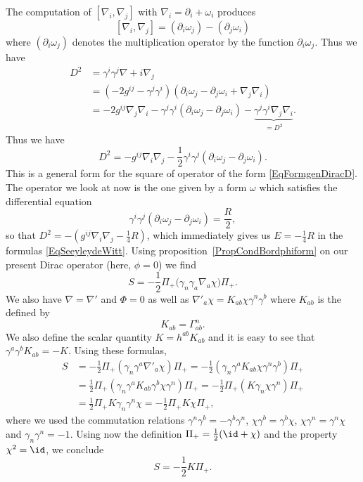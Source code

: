 The computation of $[\nabla_i,\nabla_j]$ with $\nabla_i=\partial_i+\omega_i$ produces
\[
	[\nabla_i,\nabla_j]=(\partial_i\omega_j)-(\partial_j\omega_i)
\]
where $(\partial_i\omega_j)$ denotes the multiplication operator by the function $\partial_i\omega_j$. Thus we have
\begin{equation}
	\begin{split}
		D^2	&=\gamma^i\gamma^j\nabla+i\nabla_j\\
		&=(-2g^{ij}-\gamma^j\gamma^i)(\partial_i\omega_j-\partial_j\omega_i+\nabla_j\nabla_i)\\
		&=-2g^{ij}\nabla_j\nabla_i-\gamma^j\gamma^i(\partial_i\omega_j-\partial_j\omega_i)-\underbrace{\gamma^j\gamma^i\nabla_j\nabla_i}_{=D^2}.
	\end{split}
\end{equation}
Thus we have
\begin{equation}
	D^2=-g^{ij}\nabla_i\nabla_j-\frac{ 1 }{2}\gamma^i\gamma^j(\partial_i\omega_j-\partial_j\omega_i).
\end{equation}
This is a general form for the square of operator of the form \eqref{EqFormgenDiracD}. The operator we look at now is the one given by a form $\omega$ which satisfies the differential equation
\begin{equation}
	\gamma^i\gamma^j(\partial_i\omega_j-\partial_j\omega_i)=\frac{ R }{ 2 },
\end{equation}
so that $D^2=-(g^{ij}\nabla_i\nabla_j-\frac{1}{ 4 }R)$, which immediately gives us $E=-\frac{1}{ 4 }R$ in the formulas \eqref{EqSeeyleydeWitt}. Using proposition~\ref{PropCondBordphiform} on our present Dirac operator (here, $\phi=0$) we find
\begin{equation}
	S=-\frac{1}{ 2 }\Pi_+\big(\gamma_n\gamma_a\nabla_a\chi \big)\Pi_+.
\end{equation}
We also have $\nabla=\nabla'$ and $\Phi=0$ as well as $\nabla'_a\chi=K_{ab}\chi\gamma^n\gamma^b$ where $K_{ab}$ is the  defined by
\[
	K_{ab}=\Gamma^n_{ab}.
\]
We also define the scalar quantity $K=h^{ab}K_{ab}$ and it is easy to see that $\gamma^a\gamma^bK_{ab}=-K$. Using these formulas,
\[
	\begin{split}
		S	&=-\frac{ 1 }{2}\Pi_+(\gamma_n\gamma^a\nabla'_a\chi)\Pi_+
		=-\frac{ 1 }{2}(\gamma_n\gamma^aK_{ab}\chi\gamma^n\gamma^b)\Pi_+\\
		&=\frac{ 1 }{2}\Pi_+(\gamma_n\gamma^a K_{ab}\gamma^b\chi\gamma^n)\Pi_+
		=-\frac{ 1 }{2}\Pi_+(K\gamma_n\chi\gamma^n)\Pi_+\\
		&=\frac{ 1 }{2}\Pi_+K\gamma_n\gamma^n\chi
		=-\frac{ 1 }{2}\Pi_+K\chi\Pi_+,
	\end{split}
\]
where we used the commutation relations $\gamma^n\gamma^b=-\gamma^b\gamma^n$, $\chi\gamma^b=\gamma^b\chi$, $\chi\gamma^n=\gamma^n\chi$ and $\gamma_n\gamma^n=-1$. Using now the definition $\Pi_+=\frac{1}{2}(\id+\chi)$ and the property $\chi^2=\id$, we conclude
\begin{equation}
	S	=	-\frac{ 1 }{2}K\Pi_+.
\end{equation}

